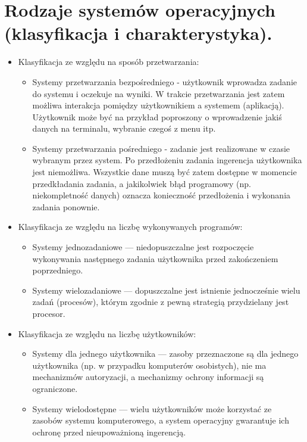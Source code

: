\documentclass[12pt,a4paper]{article}
\begin{document}
	\section{Rodzaje systemów operacyjnych (klasyfikacja i charakterystyka).}
	\begin{itemize}
		\item Klasyfikacja ze względu na sposób przetwarzania:
		\begin{itemize}
			\item Systemy przetwarzania bezpośredniego - użytkownik wprowadza zadanie do systemu i oczekuje na wyniki. W trakcie przetwarzania jest zatem możliwa interakcja pomiędzy użytkownikiem a systemem (aplikacją). Użytkownik może być na przykład poproszony o wprowadzenie jakiś danych na terminalu, wybranie czegoś z menu itp.
			\item Systemy przetwarzania pośredniego -  zadanie jest realizowane w czasie wybranym przez system. Po przedłożeniu zadania ingerencja użytkownika jest niemożliwa. Wszystkie dane muszą być zatem dostępne w momencie przedkładania zadania, a jakikolwiek błąd programowy (np. niekompletność danych) oznacza konieczność przedłożenia i wykonania zadania ponownie.
		\end{itemize}
	
		\item Klasyfikacja ze względu na liczbę wykonywanych programów:
		\begin{itemize}
			\item  Systemy jednozadaniowe — niedopuszczalne jest rozpoczęcie wykonywania następnego zadania użytkownika przed zakończeniem poprzedniego.
			\item Systemy wielozadaniowe — dopuszczalne jest istnienie jednocześnie wielu zadań (procesów), którym zgodnie z pewną strategią przydzielany jest procesor.
		\end{itemize}
	
		\item Klasyfikacja ze względu na liczbę użytkowników:
		\begin{itemize}
			\item Systemy dla jednego użytkownika — zasoby przeznaczone są dla jednego użytkownika (np. w przypadku komputerów osobistych), nie ma mechanizmów autoryzacji, a mechanizmy ochrony informacji są ograniczone.
			\item Systemy wielodostępne — wielu użytkowników może korzystać ze zasobów systemu komputerowego, a system operacyjny gwarantuje ich ochronę przed nieupoważnioną ingerencją.
		\end{itemize}
	

\end{itemize}
\end{document}
